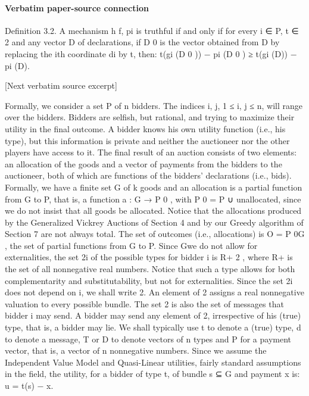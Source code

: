 \documentclass[10pt]{article}
\begin{document}
\paragraph{Verbatim paper-source connection}
\begin{ReviewVerbatim}
Definition 3.2. A mechanism h f, pi is truthful if and only if for every i ∈ P,
t ∈ 2 and any vector D of declarations, if D 0 is the vector obtained from D by
replacing the ith coordinate di by t, then: t(gi (D 0 )) − pi (D 0 ) ≥ t(gi (D)) − pi (D).

[Next verbatim source excerpt]

Formally, we consider a set P of n bidders. The indices i, j, 1 ≤ i, j ≤ n, will
range over the bidders. Bidders are selfish, but rational, and trying to maximize their
utility in the final outcome. A bidder knows his own utility function (i.e., his type),
but this information is private and neither the auctioneer nor the other players have
access to it. The final result of an auction consists of two elements: an allocation
of the goods and a vector of payments from the bidders to the auctioneer, both of
which are functions of the bidders’ declarations (i.e., bids). Formally, we have a
finite set G of k goods and an allocation is a partial function from G to P, that is, a
function a : G → P 0 , with P 0 = P ∪ {unallocated}, since we do not insist that all
goods be allocated. Notice that the allocations produced by the Generalized Vickrey
Auctions of Section 4 and by our Greedy algorithm of Section 7 are not always
total. The set of outcomes (i.e., allocations) is O = P 0G , the set of partial functions
from G to P. Since Gwe do not allow for externalities, the set 2i of the possible types
for bidder i is R+ 2 , where R+ is the set of all nonnegative real numbers. Notice
that such a type allows for both complementarity and substitutability, but not for
externalities. Since the set 2i does not depend on i, we shall write 2. An element
of 2 assigns a real nonnegative valuation to every possible bundle. The set 2 is
also the set of messages that bidder i may send. A bidder may send any element of
2, irrespective of his (true) type, that is, a bidder may lie. We shall typically use t
to denote a (true) type, d to denote a message, T or D to denote vectors of n types
and P for a payment vector, that is, a vector of n nonnegative numbers.
Since we assume the Independent Value Model and Quasi-Linear utilities, fairly
standard assumptions in the field, the utility, for a bidder of type t, of bundle s ⊆ G
and payment x is:
u = t(s) − x.


\end{ReviewVerbatim}
\end{document}
